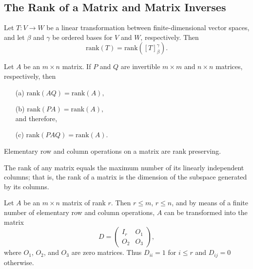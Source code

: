 \subsection{The Rank of a Matrix and Matrix Inverses}
\begin{theorem}
    Let \( T: V \to W \) be a linear transformation between finite-dimensional vector spaces, and let \( \beta \) and \( \gamma \) be ordered bases for \( V \) and \( W \), respectively. Then 
\[
\text{rank}(T) = \text{rank}([T]_\beta^\gamma).
\]
\end{theorem}
\newpage
\begin{theorem}
    Let \( A \) be an \( m \times n \) matrix. If \( P \) and \( Q \) are invertible \( m \times m \) and \( n \times n \) matrices, respectively, then
\begin{enumerate}
    \item[(a)] \(\text{rank}(AQ) = \text{rank}(A),\)
    \item[(b)] \(\text{rank}(PA) = \text{rank}(A),\) \\
    and therefore,
    \item[(c)] \(\text{rank}(PAQ) = \text{rank}(A).\)
\end{enumerate}
\end{theorem}
\vspace{10cm}
\begin{corollary}
    Elementary row and column operations on a matrix are rank preserving.
\end{corollary}
\newpage
\begin{theorem}
    The rank of any matrix equals the maximum number of its linearly independent columns; that is, the rank of a matrix is the dimension of the subspace generated by its columns.
\end{theorem}
\vspace{7cm}
\begin{theorem}
    Let \( A \) be an \( m \times n \) matrix of rank \( r \). Then \( r \leq m \), \( r \leq n \), and by means of a finite number of elementary row and column operations, \( A \) can be transformed into the matrix
    \[
    D = \begin{pmatrix}
        I_r & O_1 \\
        O_2 & O_3
    \end{pmatrix},
    \]
    where \( O_1 \), \( O_2 \), and \( O_3 \) are zero matrices. Thus \( D_{ii} = 1 \) for \( i \leq r \) and \( D_{ij} = 0 \) otherwise.
\end{theorem}
\newpage

